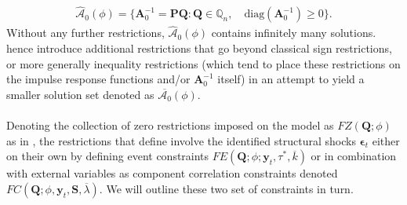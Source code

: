\documentclass[a4paper,11pt,listof=nochaptergap,oneside,pointednumbers,bibtotoc,bigheadings,liststotoc]{scrbook}
\theoremstyle{mysatz}
\theoremstyle{mydefinition}
\theoremstyle{mybemerkung}
\let\oldhat\hat
\newcommand{\vect}[1]{\boldsymbol{\mathbf{#1}}}
\newcommand{\hatt}[1]{\oldhat{\boldsymbol{\mathbf{#1}}}}
\begin{document}
\begin{equation} \label{eq:svar_ludvi8}
\begin{split}
 			\hatt{\mathcal{A}}_0(\phi) = \{\vect{A}_0^{-1} = \vect{P}\vect{Q}: \vect{Q} \in \mathbb{Q}_n, \quad \text{diag}(\vect{A}_0^{-1}) \geq 0\}.
\end{split}								
\end{equation}
Without any further restrictions, $\hatt{\mathcal{A}}_0(\phi)$ contains infinitely many solutions. \citet{ludvigsonetal:18} hence introduce additional restrictions that go beyond classical sign restrictions, or more generally inequality restrictions (which tend to place these restrictions on the impulse response functions and/or $\vect{A}_0^{-1}$ itself) in an attempt to yield a smaller solution set denoted as $\overline{\mathcal{A}_0}(\phi)$.\\
\\
Denoting the collection of zero restrictions imposed on the model as $FZ(\vect{Q}; \phi)$ as in \citet{rubioetal:10}, the restrictions that \citet{ludvigsonetal:18} define involve the identified structural shocks $\vect{\epsilon}_t$ either on their own by defining event constraints $FE(\vect{Q}; \phi; \vect{y}_t, \tau^*, \overline{k})$ or in combination with external variables as component correlation constraints denoted $FC(\vect{Q}; \phi, \vect{y}_t, \vect{S}, \overline{\lambda})$. We will outline these two set of constraints in turn.
\end{document}
